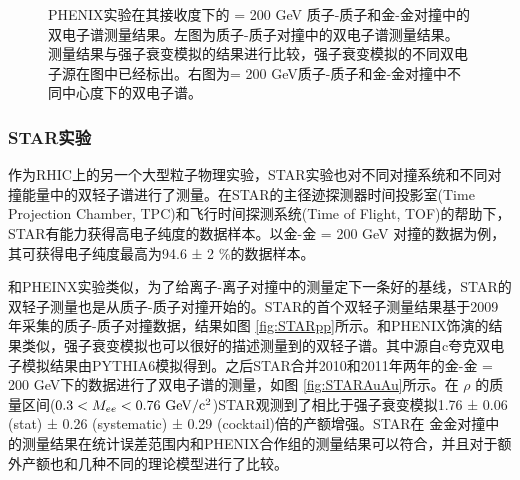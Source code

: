 \begin{figure}[htb]
\begin{subfigure}[b]{0.45\textwidth}
        \caption{}
        \label{fig:PHENIXAuAu}
    \end{subfigure}
    \caption[PHENIX实验 \sNN = 200 GeV 质子-质子和金-金对撞中的双电子谱测量结果]{PHENIX实验在其接收度下的 \sNN = 200 GeV 质子-质子和金-金对撞中的双电子谱测量结果。左图为质子-质子对撞中的双电子谱测量结果。测量结果与强子衰变模拟的结果进行比较，强子衰变模拟的不同双电子源在图中已经标出。右图为\sNN = 200 GeV质子-质子和金-金对撞中不同中心度下的双电子谱。}
       \label{fig:PHENIXDiElectron}
\end{figure}

\subsubsection{STAR实验}

作为RHIC上的另一个大型粒子物理实验，STAR实验也对不同对撞系统和不同对撞能量中的双轻子谱进行了测量。在STAR的主径迹探测器时间投影室(Time Projection Chamber, TPC)和飞行时间探测系统(Time of Flight, TOF)的帮助下，STAR有能力获得高电子纯度的数据样本。以金-金 \sNN = 200 GeV 对撞的数据为例，其可获得电子纯度最高为94.6 ± 2 \%的数据样本。

和PHEINX实验类似，为了给离子-离子对撞中的测量定下一条好的基线，STAR的双轻子测量也是从质子-质子对撞开始的。STAR的首个双轻子测量结果基于2009年采集的质子-质子对撞数据，结果如图 \ref{fig:STARpp}所示。和PHENIX饰演的结果类似，强子衰变模拟也可以很好的描述测量到的双轻子谱。其中源自c夸克双电子模拟结果由PYTHIA6模拟得到。之后STAR合并2010和2011年两年的金-金 \sNN = 200 GeV下的数据进行了双电子谱的测量，如图 \ref{fig:STARAuAu}所示。在 $\rho$ 的质量区间($0.3 < M_{ee} < 0.76 ~{\rm GeV/c^2}$)STAR观测到了相比于强子衰变模拟1.76 ± 0.06 (stat) ± 0.26 (systematic) ± 0.29 (cocktail)倍的产额增强。STAR在 \sNNerbai 金金对撞中的测量结果在统计误差范围内和PHENIX合作组的测量结果可以符合，并且对于额外产额也和几种不同的理论模型进行了比较。

